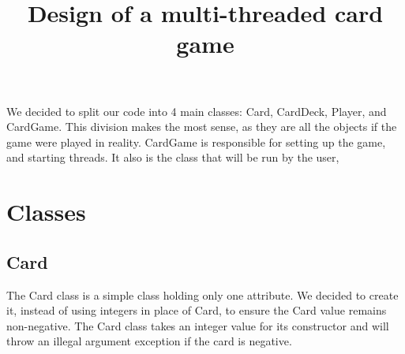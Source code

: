 \documentclass[11p]{article}
\title{Design of a multi-threaded card game}
\date{}
\begin{document}
\maketitle

We decided to split our code into 4 main classes: Card, CardDeck, Player, and CardGame. This division makes the most sense, as they are all the objects if the game were played in reality. CardGame is responsible for setting up the game, and starting threads. It also is the class that will be run by the user,
\section{Classes}
\subsection{Card}
The Card class is a simple class holding only one attribute. We decided to create it, instead of using integers in place of Card, to ensure the Card value remains non-negative. The Card class takes an integer value for its constructor and will throw an illegal argument exception if the card is negative.
\end{document}
